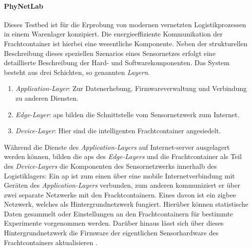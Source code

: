 \paragraph{PhyNetLab} Dieses Testbed ist für die Erprobung von modernen vernetzten Logistikprozessen in einem Warenlager konzipiert. Die energieeffiziente Kommunikation der Frachtcontainer ist hierbei eine wesentliche Komponente. Neben der strukturellen Beschreibung dieses speziellen Szenarios eines Sensornetzes erfolgt eine detaillierte Beschreibung der Hard- und Softwarekomponenten.  Das System besteht aus drei Schichten, so genannten \emph{Layern}.
\begin{enumerate}
	\item \emph{Application-Layer}: Zur Datenerhebung, Firmwareverwaltung und Verbindung zu anderen Diensten.
	\item \emph{Edge-Layer}: \acfp{ap} bilden die Schnittstelle vom Sensornetzwerk zum Internet.
	\item \emph{Device-Layer}:  Hier sind die intelligenten Frachtcontainer angesiedelt.
\end{enumerate}
Während die Dienste des \emph{Application-Layers} auf Internet-\gls{server} ausgelagert werden können, bilden die \acsp{ap} des \emph{Edge-Layers} und die Frachtcontainer als Teil des \emph{Device-Layers} die Komponenten des Sensornetzwerks innerhalb des Logistiklagers: Ein \acs{ap} ist zum einen über eine mobile Internetverbindung mit Geräten des \emph{Application-Layers} verbunden, zum anderen kommuniziert er über zwei separate Netzwerke mit den Frachtcontainern. Eines davon ist ein \gls{zigbee} Netzwerk, welches als Hintergrundnetzwerk fungiert. Hierüber können statistische Daten gesammelt oder Einstellungen an den Frachtcontainern für bestimmte Experimente vorgenommen werden. Darüber hinaus lässt sich über dieses Hintergrundnetzwerk die Firmware der eigentlichen Sensorhardware des Frachtcontainers aktualisieren  \cite{Falkenberg2017b}.

